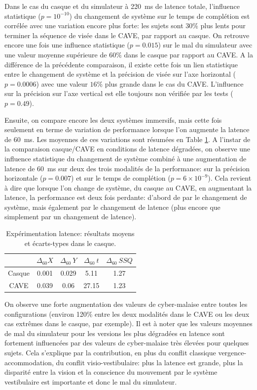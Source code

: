 	\par Dans le cas du casque et du simulateur à 220~ms de latence totale, l'influence statistique ($p = 10^{-10}$) du changement de système sur le temps de complétion est corrélée avec une variation encore plus forte: les sujets sont $30\%$ plus lents pour terminer la séquence de visée dans le CAVE, par rapport au casque. On retrouve encore une fois une influence statistique ($p = 0.015$) sur le mal du simulateur avec une valeur moyenne supérieure de $60\%$ dans le casque par rapport au CAVE. A la différence de la précédente comparaison, il existe cette fois un lien statistique entre le changement de système et la précision de visée sur l'axe horizontal ($p = 0.0006$) avec une valeur $16\%$ plus grande dans le cas du CAVE. L'influence sur la précision sur l'axe vertical est elle toujours non vérifiée par les tests ($p = 0.49$).
	
	\par Ensuite, on compare encore les deux systèmes immersifs, mais cette fois seulement en terme de variation de performance lorsque l'on augmente la latence de 60~ms. Les moyennes de ces variations sont résumées en Table \ref{tab:resultats_delta_casque_cave}. A l'instar de la comparaison casque/CAVE en conditions de latence dégradées, on observe une influence statistique du changement de système combiné à une augmentation de latence de 60~ms sur deux des trois modalités de la performance: sur la précision horizontale ($p = 0.007$) et sur le temps de complétion ($p = 6 \times 10^{-9}$). Cela revient à dire que lorsque l'on change de système, du casque au CAVE, en augmentant la latence, la performance est deux fois perdante: d'abord de par le changement de système, mais également par le changement de latence (plus encore que simplement par un changement de latence).
	
	\begin{table}[h]	
		\centering
		\caption{Expérimentation latence: résultats moyens et écarts-types dans le casque.}
		\label{tab:resultats_delta_casque_cave}
		\begin{tabular}{c|c|c|c|c}
			& $\Delta_{60}X$ & $\Delta_{60}~Y$ & $\Delta_{60}~t$ & $\Delta_{60}~SSQ$\\ \hline
			Casque & 0.001 & 0.029 & 5.11 & 1.27\\
			CAVE & 0.039 & 0.06 & 27.15 & 1.23\\
		\end{tabular}
	\end{table}
	
	\par On observe une forte augmentation des valeurs de cyber-malaise entre toutes les configurations (environ 120\% entre les deux modalités dans le CAVE ou les deux cas extrêmes dans le casque, par exemple). Il est à noter que les valeurs moyennes de mal du simulateur pour les versions les plus dégradées en latence sont fortement influencées par des valeurs de cyber-malaise très élevées pour quelques sujets. Cela s'explique par la contribution, en plus du conflit classique vergence-accommodation, du conflit visio-vestibulaire: plus la latence est grande, plus la disparité entre la vision et la conscience du mouvement par le système vestibulaire est importante et donc le mal du simulateur.	
	
